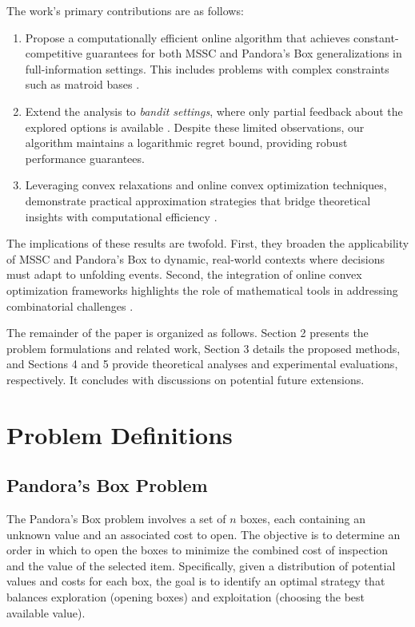 \documentclass[11pt,a4paper]{article}
\begin{document}
The work's primary contributions are as follows:
\begin{enumerate}
    \item Propose a computationally efficient online algorithm that achieves constant-competitive guarantees for both MSSC and Pandora's Box generalizations in full-information settings. This includes problems with complex constraints such as matroid bases \cite{bansal2010constant}.
    \item Extend the analysis to \textit{bandit settings}, where only partial feedback about the explored options is available \cite{flaxman2004online}. Despite these limited observations, our algorithm maintains a logarithmic regret bound, providing robust performance guarantees.
    \item Leveraging convex relaxations and online convex optimization techniques, demonstrate practical approximation strategies that bridge theoretical insights with computational efficiency \cite{shalev2007primal}.
\end{enumerate}

The implications of these results are twofold. First, they broaden the applicability of MSSC and Pandora's Box to dynamic, real-world contexts where decisions must adapt to unfolding events. Second, the integration of online convex optimization frameworks highlights the role of mathematical tools in addressing combinatorial challenges \cite{gergatsouli2022online}.

The remainder of the paper is organized as follows. Section 2 presents the problem formulations and related work, Section 3 details the proposed methods, and Sections 4 and 5 provide theoretical analyses and experimental evaluations, respectively. It concludes with discussions on potential future extensions.
\pagebreak

\section{Problem Definitions}
\subsection{Pandora’s Box Problem}
The Pandora’s Box problem involves a set of \( n \) boxes, each containing an unknown value and an associated cost to open. The objective is to determine an order in which to open the boxes to minimize the combined cost of inspection and the value of the selected item. Specifically, given a distribution of potential values and costs for each box, the goal is to identify an optimal strategy that balances exploration (opening boxes) and exploitation (choosing the best available value). 
\end{document}
